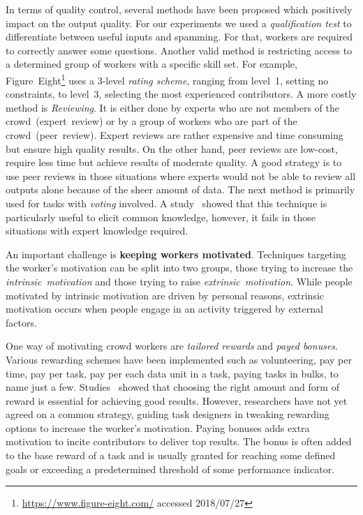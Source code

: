 In terms of quality control, several methods have been proposed which positively impact on the output quality. 
For our experiments we used a \emph{qualification test} to differentiate between useful inputs and spamming. For that, workers are required to correctly answer some questions. Another valid method is restricting access to a determined group of workers with a specific skill set. For example, Figure~Eight\footnote{\url{https://www.figure-eight.com/} accessed 2018/07/27} uses a 3-level \emph{rating scheme}, ranging from level~1, setting no constraints, to level~3, selecting the most experienced contributors. A more costly method is \emph{Reviewing}. It is either done by experts who are not members of the crowd~(expert~review) or by a group of workers who are part of the crowd~(peer~review). Expert reviews are rather expensive and time consuming but ensure high quality results. On the other hand, peer reviews are low-cost, require less time but achieve results of moderate quality. A good strategy is to use peer reviews in those situations where experts would not be able to review all outputs alone because of the sheer amount of data. 
The next method is primarily used for tasks with \emph{voting} involved. A study~\cite{waggoner2014} showed that this technique is particularly useful to elicit common knowledge, however, it fails in those situations with expert knowledge required. 

An important challenge is \textbf{keeping workers motivated}. Techniques targeting the worker's motivation can be split into two groups, those trying to increase the \emph{intrinsic~motivation} and those trying to raise \emph{extrinsic~motivation}. While people motivated by intrinsic motivation are driven by personal reasons, extrinsic motivation occurs when people engage in an activity triggered by external factors. 

One way of motivating crowd workers are \textit{tailored rewards} and \textit{payed bonuses}. Various rewarding schemes have been implemented such as volunteering, pay per time, pay per task, pay per each data unit in a task, paying tasks in bulks, to name just a few. Studies~\cite{faradani2011, ho2015} showed that choosing the right amount and form of reward is essential for achieving good results. However, researchers have not yet agreed on a common strategy, guiding task designers in tweaking rewarding options to increase the worker's motivation. 
Paying bonuses adds extra motivation to incite contributors to deliver top results. The bonus is often added to the base reward of a task and is usually granted for reaching some defined goals or exceeding a predetermined threshold of some performance indicator. 

